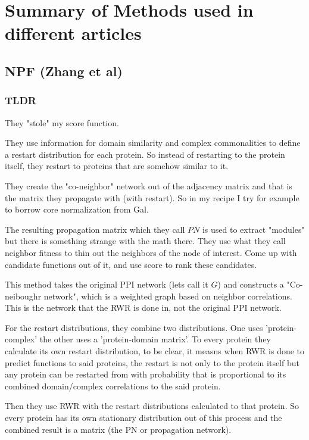 \documentclass[10pt]{article}
\theoremstyle{definition}
\theoremstyle{remark}
\theoremstyle{plain}
\begin{document}
\section{Summary of Methods used in different articles}
\subsection{NPF (Zhang et al)}
\begin{framed}
\subsubsection*{TLDR}
They "stole" my score function.

They use information for domain similarity and complex commonalities
to define a restart distribution for each protein. So instead of
restarting to the protein itself, they restart to proteins that are
somehow similar to it.

They create the "co-neighbor" network out of the adjacency matrix
and that is the matrix they propagate with (with restart).
So in my recipe I try for example to borrow core normalization
from Gal.

The resulting propagation matrix which they call $PN$ is used to
extract "modules" but there is something strange with the math
there. They use what they call neighbor fitness to thin out the
neighbors of the node of interest. Come up with candidate functions
out of it, and use score to rank these candidates.
\end{framed}

This method takes the original PPI network (lets call it $G$) and
constructs a "Co-neiboughr network", which is a weighted graph based
on neighbor correlations. This is the network that the RWR is done
in, not the original PPI network.

For the restart distributions, they combine two distributions.
One uses 'protein-complex' the other uses a 'protein-domain matrix'.
To every protein they calculate its own restart distribution, to be
clear, it measns when RWR is done to predict functions to said
proteins, the restart is not only to the protein itself but any
protein can be restarted from with probability that is proportional
to its combined domain/complex correlations to the said protein.

Then they use RWR with the
restart distributions calculated to that protein. So every protein
has its own stationary distribution out of this process and the
combined result is a matrix (the PN or propagation network).
\end{document}
